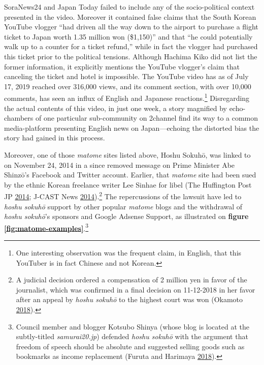 \documentclass[10pt,british,A4paper,twoside]{memoir}
\begin{document}
SoraNews24 and Japan Today failed to include any of the socio-political
context presented in the video. Moreover it contained false claims that
the South Korean YouTube vlogger ``had driven all the way down to the
airport to purchase a flight ticket to Japan worth 1.35 million won
(\$1,150)'' and that ``he could potentially walk up to a counter for a
ticket refund,'' while in fact the vlogger had purchased this ticket
prior to the political tensions. Although Hachima Kiko did not list the
former information, it explicitly mentions the YouTube vlogger's claim
that canceling the ticket and hotel is impossible. The YouTube video has
as of July 17, 2019 reached over 316,000 views, and its comment section,
with over 10,000 comments, has seen an influx of English and Japanese
reactions.\footnote{One interesting observation was the frequent claim,
  in English, that this YouTuber is in fact Chinese and not Korean.}
Disregarding the actual contents of this video, in just one week, a
story magnified by echo-chambers of one particular sub-community on
2channel find its way to a common media-platform presenting English news
on Japan---echoing the distorted bias the story had gained in this
process.

Moreover, one of those \emph{matome} sites listed above, Hoshu Sokuhō,
was linked to on November 24, 2014 in a since removed message on Prime
Minister Abe Shinzō's Facebook and Twitter account. Earlier, that
\emph{matome} site had been sued by the ethnic Korean freelance writer
Lee Sinhae for libel (The Huffington Post JP
\protect\hyperlink{ref-the_huffington_post_jp_lee_2014}{2014}; J-CAST
News \protect\hyperlink{ref-j-cast_news_eng:_2014}{2014}).\footnote{A
  judicial decision ordered a compensation of 2 million yen in favor of
  the journalist, which was confirmed in a final decision on 11-12-2018
  in her favor after an appeal by \emph{hoshu sokuhō} to the highest
  court was won (Okamoto
  \protect\hyperlink{ref-okamoto_eng:_2018}{2018}).} The repercussions
of the lawsuit have led to \emph{hoshu sokuhō} support by other popular
\emph{matome} blogs and the withdrawal of \emph{hoshu sokuhō}'s sponsors
and Google Adsense Support, as illustrated on \textbf{figure
\ref{fig:matome-examples}}.\footnote{Council member and blogger Kotsubo
  Shinya (whose blog is located at the subtly-titled
  \emph{samurai20.jp}) defended \emph{hoshu sokuhō} with the argument
  that freedom of speech should be absolute and suggested selling goods
  such as bookmarks as income replacement (Furuta and Harimaya
  \protect\hyperlink{ref-furuta_eng:_2018}{2018}).}
\end{document}
